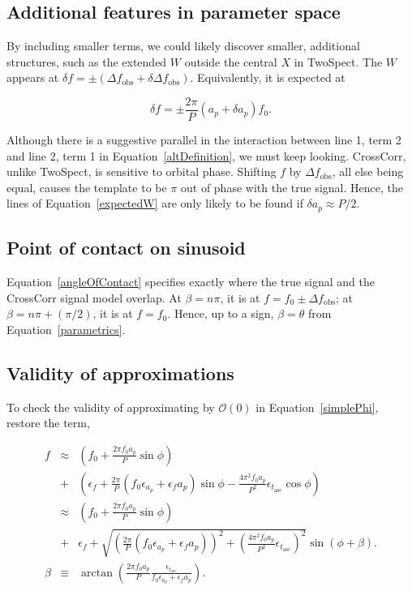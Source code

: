 \documentclass{article}
\begin{document}
\subsection{Additional features in parameter space}

By including smaller terms, we could likely discover smaller, additional structures, such as the extended $W$ outside the central $X$ in TwoSpect.
The $W$ appears at $\delta f = \pm (\Delta f_\mathrm{obs} + \delta \Delta f_\mathrm{obs})$.
Equivalently, it is expected at

\begin{equation}
\delta f = \pm \frac{2\pi}{P} (a_p + \delta a_p) f_0.
\label{expectedW}
\end{equation}

\noindent Although there is a suggestive parallel in the interaction between line 1, term 2 and line 2, term 1 in Equation~\ref{altDefinition}, we must keep looking.
CrossCorr, unlike TwoSpect, is sensitive to orbital phase. 
Shifting $f$ by $\Delta f_\mathrm{obs}$, all else being equal, causes the template to be $\pi$ out of phase with the true signal.
Hence, the lines of Equation~\ref{expectedW} are only likely to be found if  $\delta a_p \approx P/2$.

\subsection{Point of contact on sinusoid}

Equation~\ref{angleOfContact} specifies exactly where the true signal and the CrossCorr signal model overlap.
At $\beta = n \pi$, it is at $f = f_0 \pm \Delta f_\mathrm{obs}$; at $\beta = n \pi + (\pi/2)$, it is at $f = f_0$.
Hence, up to a sign, $\beta = \theta$ from Equation~\ref{parametrics}.

\subsection{Validity of approximations}
To check the validity of approximating by $\mathcal{O}(0)$ in Equation~\ref{simplePhi}, restore the term,

\begin{eqnarray}
f  &\approx& \left(f_0 + \frac{2\pi f_0 a_p}{P} \sin \phi \right) \nonumber \\
  &+& \left(\epsilon_f + \frac{2 \pi}{P} (f_0 \epsilon_{a_p} + \epsilon_f a_p) \sin\phi - \frac{4 \pi^2 f_0 a_p}{P^2} \epsilon_{t_\mathrm{asc}} \cos\phi\right)
\label{betterApprox}\\
 &\approx& \left(f_0 + \frac{2\pi f_0 a_p}{P} \sin \phi \right) \nonumber\\
  &+& \epsilon_f  + \sqrt{\left(\frac{2 \pi}{P} (f_0 \epsilon_{a_p} + \epsilon_f a_p )\right)^2 + \left(\frac{4 \pi^2 f_0 a_p}{P^2} \epsilon_{t_\mathrm{asc}}\right)^2 } \sin \left(\phi + \beta \right). \label{bestDefinition}\\
\beta &\equiv& \arctan\left(\frac{2\pi f_0 a_p}{P} \frac{\epsilon_{t_\mathrm{asc}}}{f_0 \epsilon_{a_p} + \epsilon_f a_p} \right).
\end{eqnarray}
\end{document}
